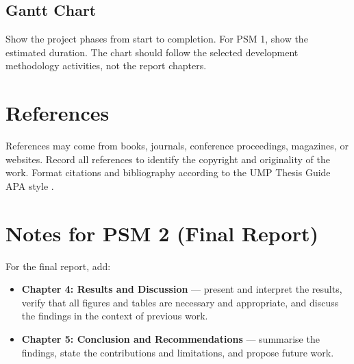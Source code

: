 \subsection{Gantt Chart}

Show the project phases from start to completion. For PSM 1, show the estimated duration. The chart should follow the selected development methodology activities, not the report chapters.

\section{References}

References may come from books, journals, conference proceedings, magazines, or websites. Record all references to identify the copyright and originality of the work. Format citations and bibliography according to the UMP Thesis Guide APA style \citep{umpthesis2019}.

\section{Notes for PSM 2 (Final Report)}

For the final report, add:

\begin{itemize}
    \item \textbf{Chapter 4: Results and Discussion} --- present and interpret the results, verify that all figures and tables are necessary and appropriate, and discuss the findings in the context of previous work.
    \item \textbf{Chapter 5: Conclusion and Recommendations} --- summarise the findings, state the contributions and limitations, and propose future work.
\end{itemize}
